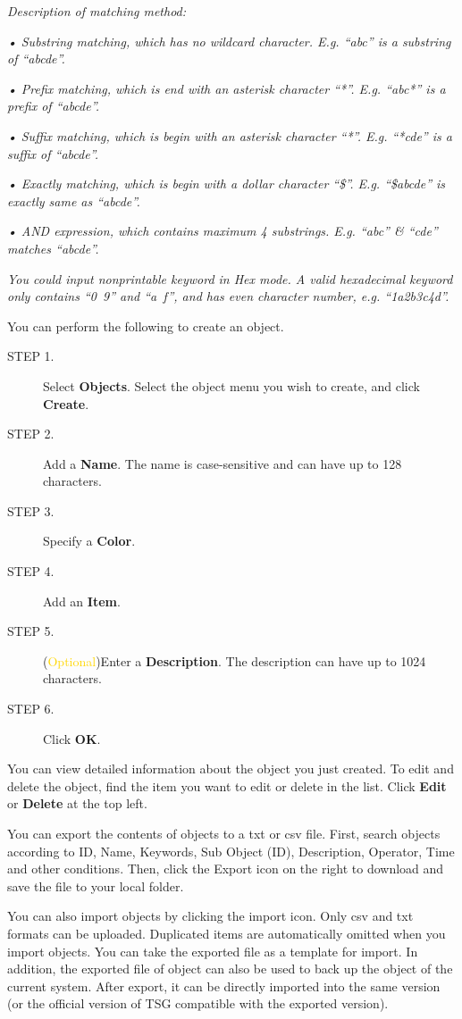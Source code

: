 \notemark\textit{Description of matching method:}


\textit{• Substring matching, which has no wildcard character. E.g. “abc” is a substring of “abcde”.}


\textit{• Prefix matching, which is end with an asterisk character “*”. E.g. “abc*” is a prefix of “abcde”.}


\textit{• Suffix matching, which is begin with an asterisk character “*”. E.g. “*cde” is a suffix of “abcde”.}


\textit{• Exactly matching, which is begin with a dollar character “\$”. E.g. “\$abcde” is exactly same as “abcde”.}


\textit{• AND expression, which contains maximum 4 substrings. E.g. “abc” \& “cde” matches “abcde”.}


\textit{You could input nonprintable keyword in Hex mode. A valid hexadecimal keyword only contains “0~9” and “a~f”, and has even character number, e.g. “1a2b3c4d”.}


You can perform the following to create an object.

\begin{description}
    \item[STEP 1.]	Select \textbf{Objects}. Select the object menu you wish to create, and click \textbf{Create}.
    \item[STEP 2.]	Add a \textbf{Name}. The name is case-sensitive and can have up to 128 characters.
    \item[STEP 3.]	Specify a \textbf{Color}.
    \item[STEP 4.]	Add an \textbf{Item}.
    \item[STEP 5.]	(\textcolor{gold}{Optional})Enter a \textbf{Description}. The description can have up to 1024 characters.
    \item[STEP 6.]	Click \textbf{OK}.
\end{description}

You can view detailed information about the object you just created. To edit and delete the object, find the item you want to edit or delete in the list. Click \textbf{Edit} or \textbf{Delete} at the top left.


You can export the contents of objects to a txt or csv file. First, search objects according to ID, Name, Keywords, Sub Object (ID), Description, Operator, Time and other conditions. 
Then, click the Export icon on the right to download and save the file to your local folder.


You can also import objects by clicking the import icon. Only csv and txt formats can be uploaded. Duplicated items are automatically omitted when you import objects. 
You can take the exported file as a template for import. In addition, the exported file of object can also be used to back up the object of the current system. After export, it can be directly imported into the same version (or the official version of TSG compatible with the exported version).


